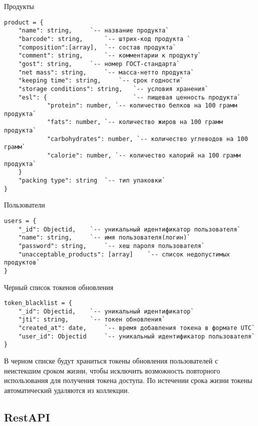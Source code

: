 Продукты
\begin{lstlisting}
product = {
	"name": string,		`-- название продукта`
	"barcode": string,		`-- штрих-код продукта `
	"composition":[array],	`-- состав продукта`
	"comment": string,		`-- комментарии к продукту`
	"gost": string,		`-- номер ГОСТ-стандарта`
	"net mass": string,		`-- масса-нетто продукта`
	"keeping time": string,		`-- срок годности`
	"storage conditions": string,	`-- условия хранения`
	"esl": {  						`-- пищевая ценность продукта`
			"protein": number, `-- количество белков на 100 грамм продукта`
			"fats": number,	`-- количество жиров на 100 грамм продукта`
			"carbohydrates": number, `-- количество углеводов на 100 грамм`
			"calorie": number, `-- количество калорий на 100 грамм продукта`
	}
	"packing type": string  `-- тип упаковки`
}
\end{lstlisting}

Пользователи
\begin{lstlisting}
users = {
	"_id": Objectid,	`-- уникальный идентификатор пользователя` 
	"name": string,		`-- имя пользователя(логин)`			
	"password": string,		`-- хеш пароля пользователя`
	"unacceptable_products": [array]	`-- список недопустимых продуктов`
}
\end{lstlisting}

Черный список токенов обновления
\begin{lstlisting}
token_blacklist = {
	"_id": Objectid,	`-- уникальный идентификатор` 
	"jti": string,		`-- токен обновления`			
	"created_at": date,		`-- время добавления токена в формате UTC`
	"user_id": Objectid		`-- уникальный идентификатор пользователя`
}
\end{lstlisting}
В черном списке будут храниться токены обновления пользователей с неистекшим сроком жизни, чтобы исключить возможность повторного использования для получения токена доступа. По истечении срока жизни токены автоматический удаляются из коллекции.

\subsection{RestAPI}

